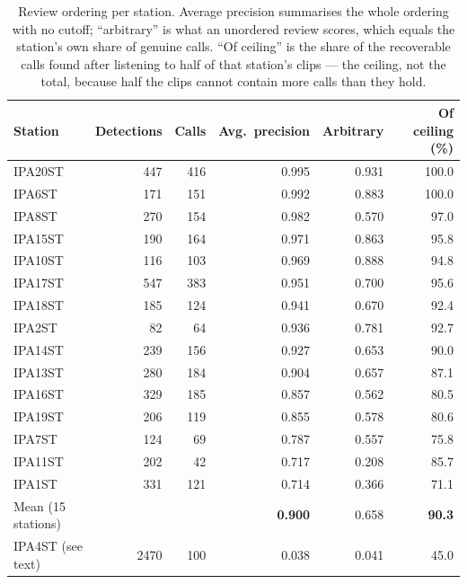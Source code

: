 \documentclass[final,3p,times]{elsarticle}
\begin{document}
\begin{table}[H]
\centering
\caption{Review ordering per station. Average precision summarises the whole
ordering with no cutoff; ``arbitrary'' is what an unordered review scores,
which equals the station's own share of genuine calls. ``Of ceiling'' is the
share of the recoverable calls found after listening to half of that station's
clips --- the ceiling, not the total, because half the clips cannot contain
more calls than they hold.}
\label{tab:ranking}
\begin{tabular}{lrrrrr}
\toprule
Station & Detections & Calls & Avg.\ precision & Arbitrary & Of ceiling (\%) \\
\midrule
IPA20ST &  447 & 416 & 0.995 & 0.931 & 100.0 \\
IPA6ST  &  171 & 151 & 0.992 & 0.883 & 100.0 \\
IPA8ST  &  270 & 154 & 0.982 & 0.570 &  97.0 \\
IPA15ST &  190 & 164 & 0.971 & 0.863 &  95.8 \\
IPA10ST &  116 & 103 & 0.969 & 0.888 &  94.8 \\
IPA17ST &  547 & 383 & 0.951 & 0.700 &  95.6 \\
IPA18ST &  185 & 124 & 0.941 & 0.670 &  92.4 \\
IPA2ST  &   82 &  64 & 0.936 & 0.781 &  92.7 \\
IPA14ST &  239 & 156 & 0.927 & 0.653 &  90.0 \\
IPA13ST &  280 & 184 & 0.904 & 0.657 &  87.1 \\
IPA16ST &  329 & 185 & 0.857 & 0.562 &  80.5 \\
IPA19ST &  206 & 119 & 0.855 & 0.578 &  80.6 \\
IPA7ST  &  124 &  69 & 0.787 & 0.557 &  75.8 \\
IPA11ST &  202 &  42 & 0.717 & 0.208 &  85.7 \\
IPA1ST  &  331 & 121 & 0.714 & 0.366 &  71.1 \\
\midrule
Mean (15 stations) & & & \textbf{0.900} & 0.658 & \textbf{90.3} \\
\midrule
IPA4ST (see text)  & 2470 & 100 & 0.038 & 0.041 & 45.0 \\
\bottomrule
\end{tabular}
\end{table}
\end{document}
